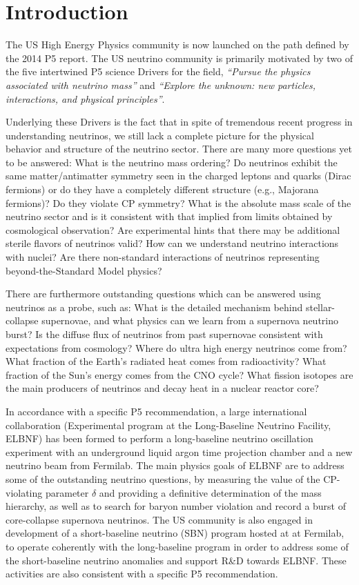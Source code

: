 \section{Introduction}
\label{sec:Introduction}


The US High Energy Physics community is now launched on the path defined by the 2014
P5 report.  The US neutrino community is primarily motivated by two of
the five intertwined P5 science Drivers for the field,
\textit{``Pursue the physics associated with neutrino mass''} and
\textit{``Explore the unknown: new particles, interactions, and
  physical principles''}. 

Underlying these Drivers is the fact that in spite of tremendous
recent progress in understanding neutrinos, we still lack a complete
picture for the physical behavior and structure of the
neutrino sector. There are many more questions yet to be answered:
What is the neutrino mass ordering? Do neutrinos exhibit the same
matter/antimatter symmetry seen in the charged leptons and quarks
(Dirac fermions) or do they have a completely different structure
(e.g., Majorana fermions)?  Do they violate CP symmetry?  What is the
absolute mass scale of the neutrino sector and is it consistent with
that implied from limits obtained by cosmological observation? Are
experimental hints that there may be additional sterile flavors of
neutrinos valid?  How can we understand neutrino interactions with
nuclei?  Are there non-standard interactions of neutrinos representing
beyond-the-Standard Model physics? 

There are furthermore outstanding questions which can be answered
using neutrinos as a probe, such as: What is the detailed mechanism
behind stellar-collapse supernovae, and what physics can we learn from
a supernova neutrino burst? Is the diffuse flux of neutrinos from past
supernovae consistent with expectations from cosmology?  Where do
ultra high energy neutrinos come from?  What fraction of the Earth's
radiated heat comes from radioactivity?  What fraction of the Sun's
energy comes from the CNO cycle?  What fission isotopes are the main
producers of neutrinos and decay heat in a nuclear reactor core?

In accordance with a specific P5 recommendation, a large international
collaboration (Experimental program at the Long-Baseline Neutrino
Facility, ELBNF) has been formed to perform a long-baseline neutrino
oscillation experiment with an underground liquid argon time
projection chamber and a new neutrino beam from
Fermilab.  The main physics goals of ELBNF are to address some of the
outstanding neutrino questions, by measuring the value of
the CP-violating parameter $\delta$ and providing a definitive
determination of the mass hierarchy, as well as to search for baryon
number violation and record a burst of core-collapse supernova
neutrinos.  The US community is also engaged in development of a
short-baseline neutrino (SBN) program hosted at at Fermilab, to operate
coherently with the long-baseline program in order to address some of the 
short-baseline neutrino anomalies and support R\&D towards ELBNF. 
These activities are also consistent with a
specific P5 recommendation.

